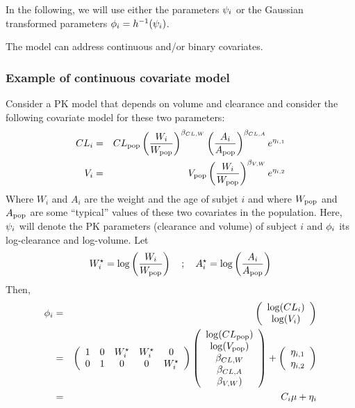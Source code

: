 In the following, we will use either the parameters ${\psi_i}$ or the Gaussian transformed parameters ${{\phi}_i}=h^{-1}({\psi_i})$.

The model can address continuous and/or binary covariates. %

\subsubsection{Example of continuous covariate model} \label{section_model_contcov}
Consider a PK model that depends on volume and clearance and consider the following covariate model for these two parameters:
\begin{eqnarray*}
CL_i & = & CL_{\rm pop}\left(\frac{W_i}{W_{\rm pop}}\right)^{\beta_{CL,W}} \left(\frac{A_i}{A_{\rm pop}}\right)^{\beta_{CL,A}} e^{\eta_{i,1}} \\
V_i & = & V_{\rm pop}\left(\frac{W_i}{W_{\rm pop}}\right)^{\beta_{V,W}}  e^{\eta_{i,2}}
\end{eqnarray*}
Where $W_i$ and $A_i$ are the weight and the age of subjet $i$ and where $W_{\rm pop}$ and $A_{\rm pop}$ are some ``typical'' values of these two covariates in the population. Here,
${\psi_i}$ will denote the PK parameters (clearance and volume) of subject $i$ and
${{\phi}_i}$ its log-clearance and log-volume.
Let
$$W^\star_i = \log\left(\frac{W_i}{W_{\rm pop}}\right) \quad ; \quad A^\star_i = \log\left(\frac{A_i}{A_{\rm pop}}\right) $$
Then,
\begin{eqnarray*}
\phigi &= & \left( \begin{array}{c}  \log(CL_i) \\  \log(V_i) \\ \end{array} \right) \\
&=& \left( \begin{array}{ccccc}  1 & 0 & W^\star_i & W^\star_i & 0 \\ 0 & 1 & 0 & 0 & W^\star_i \\ \end{array} \right)
\left( \begin{array}{c}  \log(CL_{\rm pop}) \\  \log(V_{\rm pop}) \\ \beta_{CL,W} \\ \beta_{CL,A} \\ \beta_{V,W} ) \\ \end{array} \right)
+  \left( \begin{array}{c}  \eta_{i,1} \\  \eta_{i,2} \\ \end{array} \right) \\
&=& \Covariate_i \fixed_effect + \etagi
\end{eqnarray*}

